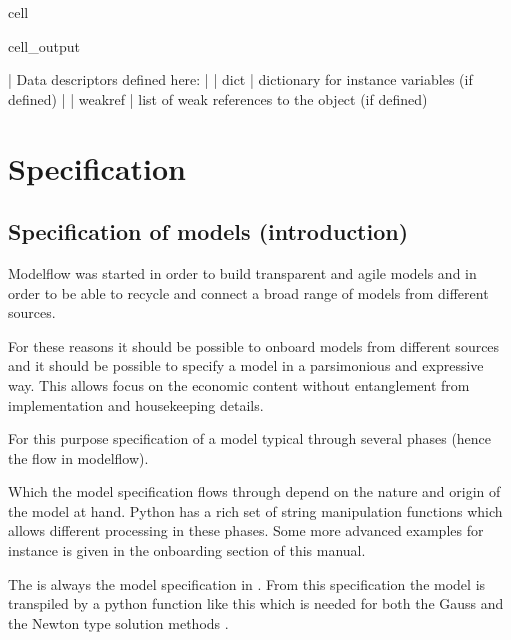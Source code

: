 \documentclass[letterpaper,10pt,english]{jupyterBook}
\begin{document}
\begin{sphinxuseclass}{cell}
\begin{sphinxVerbatimOutput}
\begin{sphinxuseclass}{cell_output}
\begin{sphinxVerbatim}[commandchars=\\\{\}]
 |  Data descriptors defined here:
 |  
 |  \PYGZus{}\PYGZus{}dict\PYGZus{}\PYGZus{}
 |      dictionary for instance variables (if defined)
 |  
 |  \PYGZus{}\PYGZus{}weakref\PYGZus{}\PYGZus{}
 |      list of weak references to the object (if defined)
\end{sphinxVerbatim}

\end{sphinxuseclass}\end{sphinxVerbatimOutput}

\end{sphinxuseclass}
\sphinxstepscope


\part{Specification}

\sphinxstepscope


\chapter{Specification of models (introduction)}
\label{\detokenize{content/notebooks/intro/model specification:specification-of-models-introduction}}\label{\detokenize{content/notebooks/intro/model specification::doc}}
\sphinxAtStartPar
Modelflow was started in order to build transparent and agile models and in order to be able to recycle and connect a broad range of models from different sources.

\sphinxAtStartPar
For these reasons it should be possible to onboard models from different sources and it should be possible to specify a model in a parsimonious and expressive way. This allows focus  on the economic content without entanglement from implementation and housekeeping details.

\sphinxAtStartPar
For this purpose specification of a model typical   through several phases (hence the flow in modelflow).

\sphinxAtStartPar
Which  the model specification flows through depend on the nature and origin of the model at hand. Python has a rich set of string manipulation functions which allows different processing in these phases. Some more advanced examples for instance {\hyperref[\detokenize{content/howto/onboard/eviews/onboard one model from  wf1::doc}]{}} is given in the onboarding section of this manual.

\sphinxAtStartPar
The  is always the model specification in . From this specification the model is  transpiled by a python function like this {\hyperref[\detokenize{content/notebooks/intro/Example Solow:solow-python-code}]{}}
which is needed for both the Gauss and the Newton type solution methods {\hyperref[\detokenize{content/notebooks/intro/model and solution:id3}]{}}.
\end{document}
